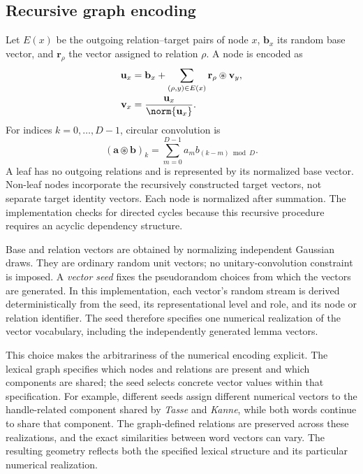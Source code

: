 \subsection{Recursive graph encoding}
\label{sec:graph-encoding}
Let $E(x)$ be the outgoing relation--target pairs of node $x$, $\mathbf b_x$ its random base vector, and $\mathbf r_\rho$ the vector assigned to relation $\rho$. A node is encoded as
\begin{align}
 \mathbf u_x &= \mathbf b_x+\sum_{(\rho,y)\in E(x)}\mathbf r_\rho\circledast\mathbf v_y,\\
 \mathbf v_x &= \frac{\mathbf u_x}{\norm{\mathbf u_x}}.
 \label{eq:recursive}
\end{align}
For indices $k=0,\ldots,D-1$, circular convolution is
\begin{equation}
 (\mathbf a\circledast\mathbf b)_k=\sum_{m=0}^{D-1}a_m b_{(k-m)\bmod D}.
\end{equation}
A leaf has no outgoing relations and is represented by its normalized base vector. Non-leaf nodes incorporate the recursively constructed target vectors, not separate target identity vectors. Each node is normalized after summation. The implementation checks for directed cycles because this recursive procedure requires an acyclic dependency structure.

Base and relation vectors are obtained by normalizing independent Gaussian draws. They are ordinary random unit vectors; no unitary-convolution constraint is imposed. A \emph{vector seed} fixes the pseudorandom choices from which the vectors are generated. In this implementation, each vector's random stream is derived deterministically from the seed, its representational level and role, and its node or relation identifier. The seed therefore specifies one numerical realization of the vector vocabulary, including the independently generated lemma vectors.

This choice makes the arbitrariness of the numerical encoding explicit. The lexical graph specifies which nodes and relations are present and which components are shared; the seed selects concrete vector values within that specification. For example, different seeds assign different numerical vectors to the handle-related component shared by \emph{Tasse} and \emph{Kanne}, while both words continue to share that component. The graph-defined relations are preserved across these realizations, and the exact similarities between word vectors can vary. The resulting geometry reflects both the specified lexical structure and its particular numerical realization.

